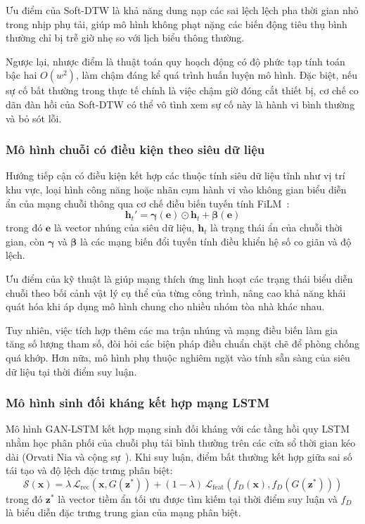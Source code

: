 Ưu điểm của Soft-DTW là khả năng dung nạp các sai lệch lệch pha thời gian nhỏ trong nhịp phụ tải, giúp mô hình không phạt nặng các biến động tiêu thụ bình thường chỉ bị trễ giờ nhẹ so với lịch biểu thông thường.

Ngược lại, nhược điểm là thuật toán quy hoạch động có độ phức tạp tính toán bậc hai $O(w^2)$, làm chậm đáng kể quá trình huấn luyện mô hình. Đặc biệt, nếu sự cố bất thường trong thực tế chính là việc chậm giờ đóng cắt thiết bị, cơ chế co dãn đàn hồi của Soft-DTW có thể vô tình xem sự cố này là hành vi bình thường và bỏ sót lỗi.

\subsubsection{Mô hình chuỗi có điều kiện theo siêu dữ liệu}

Hướng tiếp cận có điều kiện kết hợp các thuộc tính siêu dữ liệu tĩnh như vị trí khu vực, loại hình công năng hoặc nhãn cụm hành vi vào không gian biểu diễn ẩn của mạng chuỗi thông qua cơ chế điều biến tuyến tính FiLM~\cite{film}:
\begin{equation*}
    \mathbf{h}_t' = \boldsymbol{\gamma}(\mathbf{e}) \odot \mathbf{h}_t + \boldsymbol{\beta}(\mathbf{e})
\end{equation*}
trong đó $\mathbf{e}$ là vector nhúng của siêu dữ liệu, $\mathbf{h}_t$ là trạng thái ẩn của chuỗi thời gian, còn $\boldsymbol{\gamma}$ và $\boldsymbol{\beta}$ là các mạng biến đổi tuyến tính điều khiển hệ số co giãn và độ lệch.

Ưu điểm của kỹ thuật là giúp mạng thích ứng linh hoạt các trạng thái biểu diễn chuỗi theo bối cảnh vật lý cụ thể của từng công trình, nâng cao khả năng khái quát hóa khi áp dụng mô hình chung cho nhiều nhóm tòa nhà khác nhau.

Tuy nhiên, việc tích hợp thêm các ma trận nhúng và mạng điều biến làm gia tăng số lượng tham số, đòi hỏi các biện pháp điều chuẩn chặt chẽ để phòng chống quá khớp. Hơn nữa, mô hình phụ thuộc nghiêm ngặt vào tính sẵn sàng của siêu dữ liệu tại thời điểm suy luận.

\subsubsection{Mô hình sinh đối kháng kết hợp mạng LSTM}

Mô hình GAN-LSTM kết hợp mạng sinh đối kháng với các tầng hồi quy LSTM nhằm học phân phối của chuỗi phụ tải bình thường trên các cửa sổ thời gian kéo dài (Orvati Nia và cộng sự~\cite{orvati2026}). Khi suy luận, điểm bất thường kết hợp giữa sai số tái tạo và độ lệch đặc trưng phân biệt:
\begin{equation*}
    \mathcal{S}(\mathbf{x}) = \lambda\,\mathcal{L}_{\mathrm{rec}}\!\left(\mathbf{x}, G(\mathbf{z}^*)\right) + (1-\lambda)\,\mathcal{L}_{\mathrm{feat}}\!\left(f_D(\mathbf{x}), f_D(G(\mathbf{z}^*))\right)
\end{equation*}
trong đó $\mathbf{z}^*$ là vector tiềm ẩn tối ưu được tìm kiếm tại thời điểm suy luận và $f_D$ là biểu diễn đặc trưng trung gian của mạng phân biệt.


